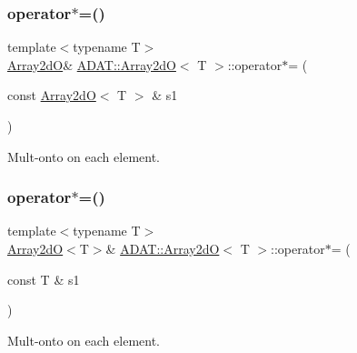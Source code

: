 \subsubsection{\texorpdfstring{operator$\ast$=()}{operator*=()}\hspace{0.1cm}{\footnotesize\ttfamily [3/6]}}
{\footnotesize\ttfamily template$<$typename T$>$ \\
\mbox{\hyperlink{classADAT_1_1Array2dO}{Array2dO}}\& \mbox{\hyperlink{classADAT_1_1Array2dO}{A\+D\+A\+T\+::\+Array2dO}}$<$ T $>$\+::operator$\ast$= (\begin{DoxyParamCaption}\item[{const \mbox{\hyperlink{classADAT_1_1Array2dO}{Array2dO}}$<$ T $>$ \&}]{s1 }\end{DoxyParamCaption})\hspace{0.3cm}{\ttfamily [inline]}}



Mult-\/onto on each element. 

\mbox{\label{classADAT_1_1Array2dO_a12856ac75f975aa6b013eac9eadd7180}} 
\subsubsection{\texorpdfstring{operator$\ast$=()}{operator*=()}\hspace{0.1cm}{\footnotesize\ttfamily [4/6]}}
{\footnotesize\ttfamily template$<$typename T$>$ \\
\mbox{\hyperlink{classADAT_1_1Array2dO}{Array2dO}}$<$T$>$\& \mbox{\hyperlink{classADAT_1_1Array2dO}{A\+D\+A\+T\+::\+Array2dO}}$<$ T $>$\+::operator$\ast$= (\begin{DoxyParamCaption}\item[{const T \&}]{s1 }\end{DoxyParamCaption})\hspace{0.3cm}{\ttfamily [inline]}}



Mult-\/onto on each element. 

\mbox{\label{classADAT_1_1Array2dO_a12856ac75f975aa6b013eac9eadd7180}} 
